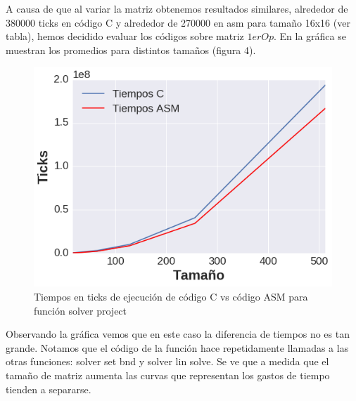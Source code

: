 A causa de que al variar la matriz obtenemos resultados similares, alrededor de 380000 ticks en código C y alrededor de 270000 en asm para tamaño 16x16 (ver tabla), hemos decidido evaluar los códigos sobre matriz $1erOp$. En la gráfica se muestran los promedios para distintos tamaños (figura 4).
\begin{figure}[h]

\centering
\includegraphics[scale=0.6] {solver_project}
   \caption{Tiempos en ticks de ejecución de código C vs código ASM para función solver project}
\end{figure}

Observando la gráfica vemos que en este caso la diferencia de tiempos no es tan grande. Notamos que el código de la función hace repetidamente llamadas a las otras funciones: solver set bnd y solver lin solve. Se ve que a medida que el tamaño de matriz aumenta las curvas que representan los gastos de tiempo tienden a separarse.




